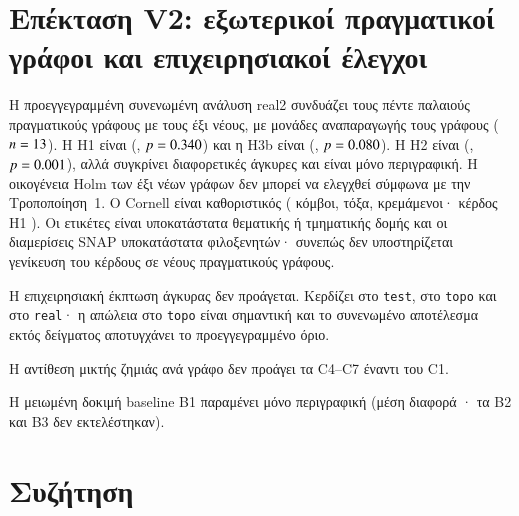 \documentclass[11pt,a4paper]{article}
\theoremstyle{definition}
\theoremstyle{remark}
\begin{document}
\FloatBarrier
\section{Επέκταση V2: εξωτερικοί πραγματικοί γράφοι και επιχειρησιακοί έλεγχοι}
\label{sec:v2extension}

Η προεγγεγραμμένη συνενωμένη ανάλυση real2 συνδυάζει τους πέντε παλαιούς πραγματικούς
γράφους με τους έξι νέους, με μονάδες αναπαραγωγής τους γράφους
($n=13$). Η H1 είναι \VTwoRealHone{} (\VTwoRealHoneWins{}, $p=0.340$)
και η H3b είναι \VTwoRealHthree{} (\VTwoRealHthreeWins{}, $p=0.080$).
Η H2 είναι \VTwoRealHtwo{} (\VTwoRealHtwoWins{}, $p=0.001$), αλλά συγκρίνει
διαφορετικές άγκυρες και είναι μόνο περιγραφική. Η οικογένεια Holm των έξι νέων
γράφων δεν μπορεί να ελεγχθεί σύμφωνα με την Τροποποίηση~1. Ο Cornell είναι
καθοριστικός (\VTwoCornellN{} κόμβοι, \VTwoCornellM{} τόξα, \VTwoCornellDang{} κρεμάμενοι·
κέρδος H1 \VTwoCornellHone{}).
Οι ετικέτες είναι υποκατάστατα θεματικής ή τμηματικής δομής και οι διαμερίσεις
SNAP υποκατάστατα φιλοξενητών· συνεπώς δεν υποστηρίζεται γενίκευση του κέρδους
σε νέους πραγματικούς γράφους.



Η επιχειρησιακή έκπτωση άγκυρας δεν προάγεται. Κερδίζει
\VTwoAnchorTest{} στο \texttt{test}, \VTwoAnchorTopo{} στο \texttt{topo} και
\VTwoAnchorReal{} στο \texttt{real}· η απώλεια στο \texttt{topo} είναι σημαντική
και το συνενωμένο αποτέλεσμα εκτός δείγματος αποτυγχάνει το προεγγεγραμμένο όριο.


Η αντίθεση μικτής ζημιάς ανά γράφο δεν προάγει τα C4--C7 έναντι του C1.

Η μειωμένη δοκιμή baseline B1 παραμένει μόνο περιγραφική (μέση διαφορά
\VTwoBOneMean{}· τα B2 και B3 δεν εκτελέστηκαν).

\FloatBarrier
\section{Συζήτηση}
\label{sec:discussion}
\end{document}
